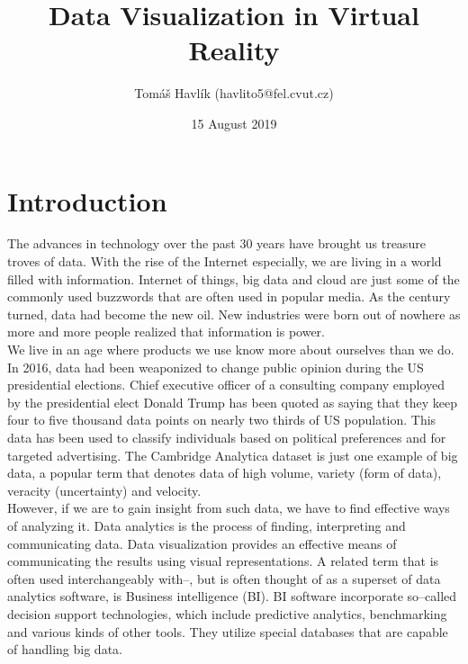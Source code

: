 \documentclass{article}
\title{Data Visualization in Virtual Reality}
\author{Tomáš Havlík (havlito5@fel.cvut.cz)}
\date{15 August 2019}
\begin{document}
\maketitle

\tableofcontents

\newpage

\section{Introduction}

The advances in technology over the past 30 years have brought us treasure troves of data. With the rise of the Internet especially, we are living in a world filled with information. Internet of things, big data and cloud are just some of the commonly used buzzwords that are often used in popular media. As the century turned, data had become the new oil. New industries were born out of nowhere as more and more people realized that information is power.\\

We live in an age where products we use know more about ourselves than we do. In 2016, data had been weaponized to change public opinion during the US presidential elections. Chief executive officer of a consulting company employed by the presidential elect Donald Trump has been quoted as saying that they keep four to five thousand data points on nearly two thirds of US population.\cite{cambridge} This data has been used to classify individuals based on political preferences and for targeted advertising. The Cambridge Analytica dataset is just one example of big data, a popular term that denotes data of high volume, variety (form of data), veracity (uncertainty) and velocity.\cite{bigdata}\\

However, if we are to gain insight from such data, we have to find effective ways of analyzing it. Data analytics is the process of finding, interpreting and communicating data. Data visualization provides an effective means of communicating the results using visual representations. A related term that is often used interchangeably with--, but is often thought of as a superset of data analytics software, is Business intelligence (BI). BI software incorporate so--called decision support technologies, which include predictive analytics, benchmarking and various kinds of other tools. They utilize special databases that are capable of handling big data.\cite{bi}\\
\end{document}
